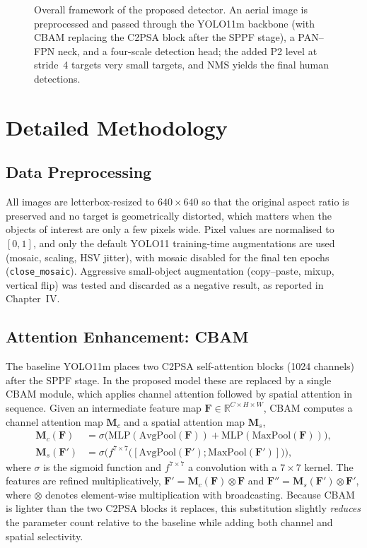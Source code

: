 \begin{figure}[tbp]
  \centering
  \caption{Overall framework of the proposed detector. An aerial image is
  preprocessed and passed through the YOLO11m backbone (with CBAM replacing the
  C2PSA block after the SPPF stage), a PAN--FPN neck, and a four-scale detection
  head; the added P2 level at stride~4 targets very small targets, and NMS yields
  the final human detections.}
  \label{fig:framework}
\end{figure}

\section{Detailed Methodology}

\subsection{Data Preprocessing}
All images are letterbox-resized to $640 \times 640$ so that the original aspect
ratio is preserved and no target is geometrically distorted, which matters when
the objects of interest are only a few pixels wide. Pixel values are normalised to
$[0,1]$, and only the default YOLO11 training-time augmentations are used
(mosaic, scaling, HSV jitter), with mosaic disabled for the final ten epochs
(\texttt{close\_mosaic}). Aggressive small-object augmentation (copy--paste,
mixup, vertical flip) was tested and discarded as a negative result, as reported
in Chapter~IV.

\subsection{Attention Enhancement: CBAM}
The baseline YOLO11m places two C2PSA self-attention blocks (1024 channels) after
the SPPF stage. In the proposed model these are replaced by a single CBAM module,
which applies channel attention followed by spatial attention in sequence. Given
an intermediate feature map $\mathbf{F} \in \mathbb{R}^{C \times H \times W}$, CBAM
computes a channel attention map $\mathbf{M}_c$ and a spatial attention map
$\mathbf{M}_s$,
\begin{align}
  \mathbf{M}_c(\mathbf{F}) &= \sigma\!\big(\mathrm{MLP}(\mathrm{AvgPool}(\mathbf{F}))
      + \mathrm{MLP}(\mathrm{MaxPool}(\mathbf{F}))\big), \\
  \mathbf{M}_s(\mathbf{F}') &= \sigma\!\big(f^{7\times7}\big([\mathrm{AvgPool}(\mathbf{F}');
      \mathrm{MaxPool}(\mathbf{F}')]\big)\big),
\end{align}
where $\sigma$ is the sigmoid function and $f^{7\times7}$ a convolution with a
$7\times7$ kernel. The features are refined multiplicatively,
$\mathbf{F}' = \mathbf{M}_c(\mathbf{F}) \otimes \mathbf{F}$ and
$\mathbf{F}'' = \mathbf{M}_s(\mathbf{F}') \otimes \mathbf{F}'$, where $\otimes$
denotes element-wise multiplication with broadcasting. Because CBAM is lighter
than the two C2PSA blocks it replaces, this substitution slightly \emph{reduces}
the parameter count relative to the baseline while adding both channel and spatial
selectivity.

